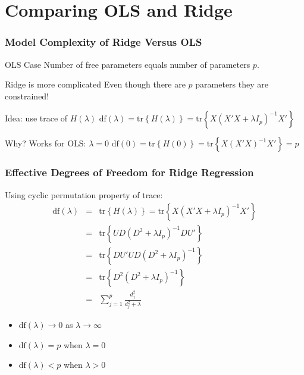 \section{Comparing OLS and Ridge}
\begin{frame}
  \frametitle{Model Complexity of Ridge Versus OLS}

  \begin{block}{OLS Case}
   Number of free parameters equals number of parameters $p$. 
  \end{block}

  \begin{block}{Ridge is more complicated}
    Even though there are $p$ parameters they are \alert{constrained}! 
  \end{block}

  \begin{block}{Idea: use trace of $H(\lambda)$}
    $\mbox{df}(\lambda) = \mbox{tr}\left\{ H(\lambda) \right\} = \mbox{tr}\left\{ X(X'X + \lambda I_p)^{-1}X' \right\}$
  \end{block}

  \begin{block}{Why? Works for OLS: $\lambda = 0$}
    $\mbox{df}(0) = \mbox{tr}\left\{ H(0) \right\} = \mbox{tr}\left\{ X(X'X)^{-1}X' \right\} = p$
  \end{block}

\end{frame}
\begin{frame}
  \frametitle{Effective Degrees of Freedom for Ridge Regression}
 
  Using cyclic permutation property of trace:
  \begin{eqnarray*}
    \mbox{df}(\lambda) &=&  \mbox{tr}\left\{ H(\lambda) \right\} = \mbox{tr}\left\{ X(X'X + \lambda I_p)^{-1}X' \right\}\\
 &=& \mbox{tr}\left\{UD\left( D^2 + \lambda I_p \right)^{-1}DU'\right\}\\
 &=& \mbox{tr}\left\{DU'UD\left( D^2 + \lambda I_p \right)^{-1}\right\}\\
 &=& \mbox{tr}\left\{D^2\left( D^2 + \lambda I_p \right)^{-1}\right\}\\
 &=& \sum_{j=1}^p\frac{d_j^2}{d_j^2 + \lambda}
  \end{eqnarray*}

  \begin{itemize}
    \item $\mbox{df}(\lambda) \rightarrow 0$ as $\lambda \rightarrow \infty$
    \item $\mbox{df}(\lambda) = p$ when $\lambda = 0$
    \item $\mbox{df}(\lambda) < p$ when $\lambda > 0$
  \end{itemize}
\end{frame}
